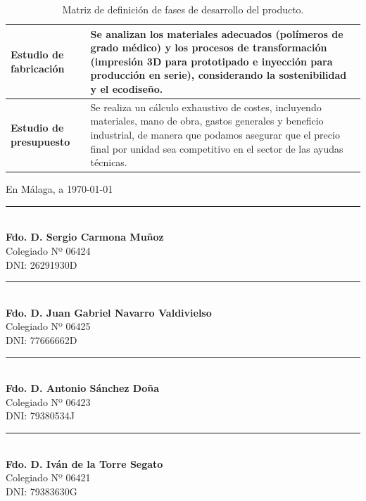 \documentclass[11pt,a4paper]{article}
\begin{document}
\begin{table}[H]
\begin{tabular}{|p{4.2cm}|p{9.8cm}|}
\hline
\textbf{Estudio de fabricación} & Se analizan los materiales adecuados (polímeros de grado médico) y los procesos de transformación (impresión 3D para prototipado e inyección para producción en serie), considerando la sostenibilidad y el ecodiseño. \\
\hline
\textbf{Estudio de presupuesto} & Se realiza un cálculo exhaustivo de costes, incluyendo materiales, mano de obra, gastos generales y beneficio industrial, de manera que podamos asegurar que el precio final por unidad sea competitivo en el sector de las ayudas técnicas. \\
\hline
\end{tabular}
\caption{Matriz de definición de fases de desarrollo del producto.}
\end{table}

\vspace{1.5cm}

\noindent\begin{minipage}{\textwidth}
    \begin{flushright}
        En Málaga, a \today
    \end{flushright}
    \vspace{2cm}

    \noindent
    \begin{minipage}[t]{0.45\textwidth}
        \centering
        \rule{6cm}{0.6pt} \\
        \textbf{Fdo. D. Sergio Carmona Muñoz} \\
        Colegiado Nº 06424 \\
        DNI: 26291930D
    \end{minipage}
    \hfill
    \begin{minipage}[t]{0.45\textwidth}
        \centering
        \rule{6cm}{0.6pt} \\
        \textbf{Fdo. D. Juan Gabriel Navarro Valdivielso} \\
        Colegiado Nº 06425 \\
        DNI: 77666662D
    \end{minipage}

    \vspace{2cm}

    \noindent
    \begin{minipage}[t]{0.45\textwidth}
        \centering
        \rule{6cm}{0.6pt} \\
        \textbf{Fdo. D. Antonio Sánchez Doña} \\
        Colegiado Nº 06423 \\
        DNI: 79380534J
    \end{minipage}
    \hfill
    \begin{minipage}[t]{0.45\textwidth}
        \centering
        \rule{6cm}{0.6pt} \\
        \textbf{Fdo. D. Iván de la Torre Segato} \\
        Colegiado Nº 06421 \\
        DNI: 79383630G
    \end{minipage}
\end{minipage}
\vspace{1cm}
\end{document}
